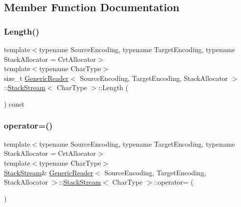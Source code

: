 \subsection{Member Function Documentation}
\mbox{\label{classGenericReader_1_1StackStream_a528a88479d08ccf62831251fbd35216b}} 
\subsubsection{\texorpdfstring{Length()}{Length()}}
{\footnotesize\ttfamily template$<$typename Source\+Encoding, typename Target\+Encoding, typename Stack\+Allocator = Crt\+Allocator$>$ \\
template$<$typename Char\+Type$>$ \\
size\+\_\+t \hyperlink{classGenericReader}{Generic\+Reader}$<$ Source\+Encoding, Target\+Encoding, Stack\+Allocator $>$\+::\hyperlink{classGenericReader_1_1StackStream}{Stack\+Stream}$<$ Char\+Type $>$\+::Length (\begin{DoxyParamCaption}{ }\end{DoxyParamCaption}) const\hspace{0.3cm}{\ttfamily [inline]}}

\mbox{\label{classGenericReader_1_1StackStream_af760ba2cf259372ffc9dd4d879cb55ef}} 
\subsubsection{\texorpdfstring{operator=()}{operator=()}}
{\footnotesize\ttfamily template$<$typename Source\+Encoding, typename Target\+Encoding, typename Stack\+Allocator = Crt\+Allocator$>$ \\
template$<$typename Char\+Type$>$ \\
\hyperlink{classGenericReader_1_1StackStream}{Stack\+Stream}\& \hyperlink{classGenericReader}{Generic\+Reader}$<$ Source\+Encoding, Target\+Encoding, Stack\+Allocator $>$\+::\hyperlink{classGenericReader_1_1StackStream}{Stack\+Stream}$<$ Char\+Type $>$\+::operator= (\begin{DoxyParamCaption}\item[{const \hyperlink{classGenericReader_1_1StackStream}{Stack\+Stream}$<$ Char\+Type $>$ \&}]{ }\end{DoxyParamCaption})\hspace{0.3cm}{\ttfamily [private]}}

